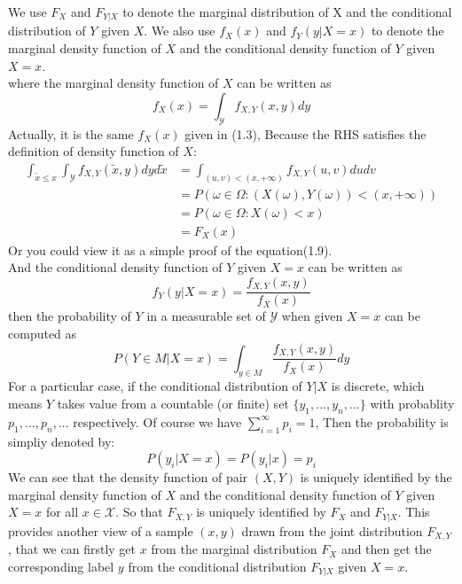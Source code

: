 \noindent We use $F_X$ and $F_{Y|X}$ to denote the marginal distribution of X and the conditional distribution of $Y$ given $X$. We also use $f_X(x)$ and $f_Y(y|X=x)$ to denote the marginal density function of $X$ and the conditional density function of $Y$ given $X=x$.\\
where the marginal density function of $X$ can be written as 
\begin{equation}
f_X(x)= \int_\mathcal{Y}f_{X,Y}(x,y) dy
\end{equation}
Actually, it is the same $f_X(x)$ given in (1.3), Because the RHS satisfies the definition of density function of $X$:
\begin{align}
\int_{\tilde{x} \leq x}	\int_\mathcal{Y}f_{X,Y}(\tilde{x},y) dy d\tilde{x} &= \int_{(u,v)<(x,+\infty)} f_{X,Y}(u,v)dudv\\
&=P(\omega\in\Omega: (X(\omega),Y(\omega))<(x,+\infty))\\
&=P(\omega\in\Omega: X(\omega)<x)\\
&=F_X(x)
\end{align}
Or you could view it as a simple proof of the equation(1.9).\\

And the conditional density function of $Y$ given $X=x$ can be written as
\begin{equation}
f_Y(y|X=x)= \frac{f_{X,Y}(x,y)}{f_X(x)}
\end{equation}
then the probability of $Y$ in a measurable set of $\mathcal{Y}$ when given $X=x$ can be computed as
\begin{equation}
P(Y \in M|X=x)= \int_{y\in M} \frac{f_{X,Y}(x,y)}{f_X(x)} dy
\end{equation}
For a particular case, if the conditional distribution of $Y|X$ is discrete, which means $Y$ takes value from a countable (or finite) set $\{y_1,...,y_n,...\}$ with probablity $p_1,...,p_n,...$ respectively. Of course we have $\sum_{i=1}^{\infty}p_i=1$, Then the probability is simpliy denoted by:
\begin{equation}
P(y_i|X=x)=P(y_i|x)=p_i
\end{equation}
We can see that the density function of pair $(X,Y)$ is uniquely identified by the marginal density function of $X$ and the conditional density function of $Y$ given $X=x$ for all $x \in \mathcal{X}$. So that $F_{X,Y}$ is uniquely identified by $F_X$ and $F_{Y|X}$. This provides another view of a sample $(x,y)$ drawn from the joint distribution $F_{X,Y}$, that we can firstly get $x$ from the marginal distribution $F_X$ and then get the corresponding label $y$ from the conditional distribution $F_{Y|X}$ given $X=x$.\\

